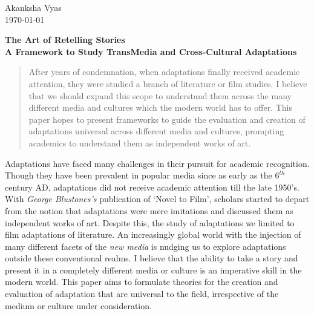\documentclass[12pt]{article}
\begin{document}
\begin{flushleft}
Akanksha Vyas\\
\today\\
\end{flushleft}
\begin{center}
\textbf{\large{The Art of Retelling Stories} \\ \small{A Framework to Study TransMedia and Cross-Cultural
Adaptations}} 
\end{center}

\vspace{0.2in}
\setlength{\parindent}{0.5in}

\begin{abstract}
After years of condemnation, when adaptations finally received academic
attention, they were studied a branch of literature or film studies. I believe
that we should expand this scope to understand them across the many different
media and cultures which the modern world has to offer.
This paper hopes to present frameworks to guide the evaluation and creation
of adaptations universal across different media and cultures, prompting
academics to understand them as independent works of art. 
\end{abstract}

Adaptations have faced many challenges in their pursuit for academic
recognition. Though they have been prevalent in popular media 
since as early as the $6^{th}$ century AD, adaptations did not receive academic 
attention till the late 1950's. With \textit{George Blustones's} publication
of `Novel to Film', scholars started to depart from the notion
that adaptations were mere imitations and discussed them as independent works 
of art. Despite this, the study of adaptations we limited to film adaptations of
literature. An increasingly global world with the injection of
many different facets of the \textit{new media} is nudging us to explore adaptations
outside these conventional realms. I believe that the ability to take a story
and present it in a completely different media or culture is an imperative skill in
the modern world. This paper aims to formulate theories for the creation and evaluation of
adaptation that are universal to the field, irrespective of the medium or culture
under consideration.
\end{document}
